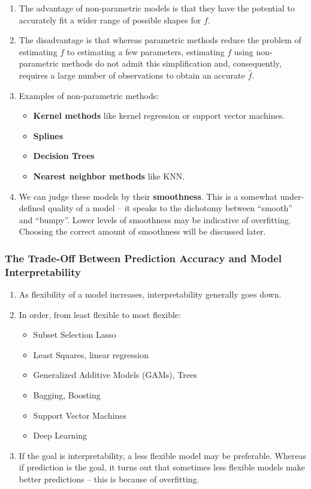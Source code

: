 \documentclass[10pt]{article}
\newcommand{\fhat}{\hat{f}}
\newcommand{\impstar}{\marginnote{\Huge{$*$}}}
\begin{document}
\begin{enumerate}
	\item The advantage of non-parametric models is that they have the potential to accurately fit a wider range of possible shapes for $f$. 
	\item The disadvantage is that whereas parametric methods reduce the problem of estimating $f$ to estimating a few parameters, estimating $f$ using non-parametric methods do not admit this simplification and, consequently, requires a large number of observations to obtain an accurate $\fhat$.
	\item Examples of non-parametric methods:
	\begin{itemize}
		\item \textbf{Kernel methods} like kernel regression or support vector machines.  
		\item \textbf{Splines}
		\item \textbf{Decision Trees}
		\item \textbf{Nearest neighbor methods} like KNN.
	\end{itemize}	
	\item We can judge these models by their \textbf{smoothness}.  {\color{brown} This is a somewhat under-defined quality of a model -- it speaks to the dichotomy between ``smooth'' and ``bumpy''.}  Lower levels of smoothness may be indicative of overfitting.  Choosing the correct amount of smoothness will be discussed later.

\end{enumerate}

\vspace{.2in} 
	
\subsubsection{The Trade-Off Between Prediction Accuracy and Model Interpretability} 

\begin{enumerate}
	\item \impstar As flexibility of a model increases, interpretability generally goes down.
	\item In order, from least flexible to most flexible:
		\begin{itemize}
			\item Subset Selection Lasso
			\item Least Squares, linear regression
			\item Generalized Additive Models (GAMs), Trees
			\item Bagging, Boosting
			\item Support Vector Machines
			\item Deep Learning
		\end{itemize}
	\item If the goal is interpretability, a less flexible model may be preferable.  Whereas if prediction is the goal, it turns out that sometimes less flexible models make better predictions -- this is because of overfitting.
\end{enumerate}
\end{document}
